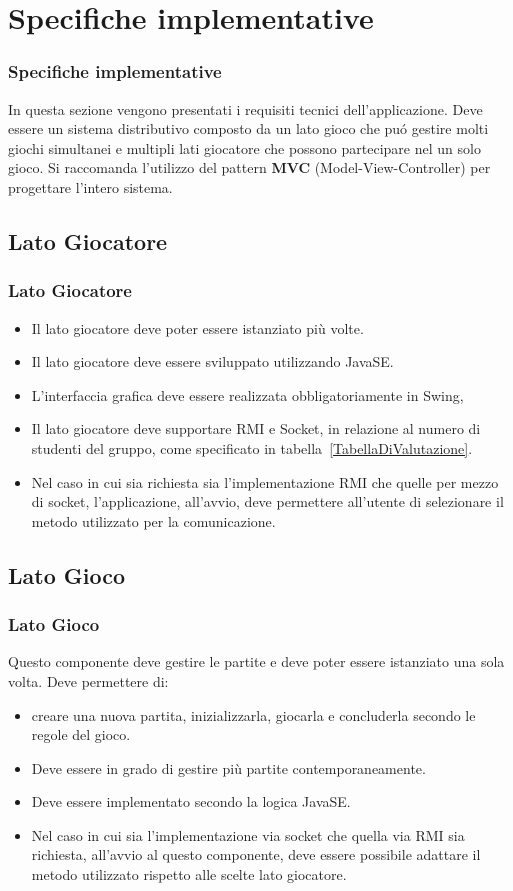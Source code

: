 \documentclass{beamer}
\begin{document}
\section{Specifiche implementative}
\begin{frame}
\frametitle{Specifiche implementative}
In questa sezione vengono presentati i requisiti tecnici
dell'applicazione.  Deve essere un sistema distributivo composto da
un lato gioco che pu\'o gestire molti giochi simultanei e multipli
lati giocatore che possono partecipare nel un solo gioco. Si raccomanda
l'utilizzo del pattern \textbf{MVC} (Model-View-Controller) per
progettare l'intero sistema.
\end{frame}

\subsection{Lato Giocatore}
\begin{frame}
\frametitle{Lato Giocatore}
\begin{itemize}
\item Il lato giocatore deve poter essere istanziato pi\`u volte. 
\item Il lato giocatore deve essere sviluppato utilizzando JavaSE. 
\item L'interfaccia grafica deve essere realizzata obbligatoriamente in Swing, 
\item Il lato giocatore deve supportare RMI e Socket, in relazione al numero di studenti del gruppo, come specificato in tabella~\ref{TabellaDiValutazione}. 
\item Nel caso in cui sia richiesta sia l'implementazione RMI che
  quelle per mezzo di socket, l'applicazione, all'avvio, deve permettere
  all'utente di selezionare il metodo utilizzato per la
  comunicazione.
\end{itemize}
\end{frame}

\subsection{Lato Gioco}
\begin{frame}
\frametitle{Lato Gioco}
Questo componente deve gestire le partite e deve poter essere
istanziato una sola volta. Deve permettere di:
\begin{itemize}
\item creare una nuova partita, inizializzarla, giocarla e concluderla secondo le regole del gioco.
\item Deve essere in grado di gestire pi\`u partite
  contemporaneamente.
\item Deve essere implementato secondo la logica JavaSE.
\item Nel caso in cui sia l'implementazione via socket che quella via
  RMI sia richiesta, all'avvio al questo componente, deve essere
  possibile adattare il metodo utilizzato rispetto alle scelte lato
  giocatore.
\end{itemize}
\end{frame}
\end{document}
